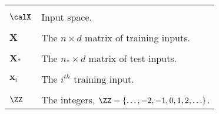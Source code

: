 \begin{longtable}{lp{}}
    \\\\
    $\calX$                                                                                                    & Input space.
    \\\\
    $\bm{X}$                                                                                                   & The $n \times d$ matrix of training inputs.
    \\\\
    $\bm{X}_{\ast}$                                                                                            & The $n_{\ast} \times d$ matrix of test inputs.
    \\\\
    $\bm{x}_{i}$                                                                                               & The $i^{th}$ training input.
    \\\\
    $\ZZ$                                                                                                      & The integers, $\ZZ = \left\{ \ldots ,-2,-1,0,1,2,\ldots \right\}$.

    \\\bottomrule
    \hline
\end{longtable}
